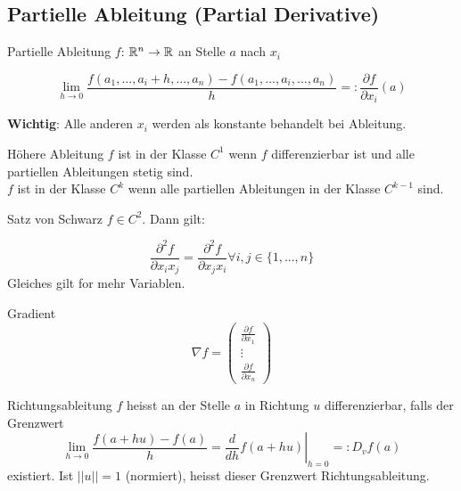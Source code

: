 \subsection{Partielle Ableitung (Partial Derivative)}
\begin{Definition}{Partielle Ableitung}{}
    $f$: $\mathbb{R}^n \rightarrow \mathbb{R}$ an Stelle $a$ nach $x_i$

    \[
        \lim_{h \rightarrow 0} \frac{f(a_1, ..., a_i + h, ..., a_n) - f(a_1, ..., a_i, ..., a_n)}{h} =: \frac{\partial f}{\partial x_i}(a)
    \]

\textbf{Wichtig}: Alle anderen $x_i$ werden als konstante behandelt bei Ableitung.
\end{Definition}

\begin{Definition}{Höhere Ableitung}{}
    $f$ ist in der Klasse $C^1$ wenn $f$ differenzierbar ist und alle partiellen Ableitungen stetig sind.\\
    $f$ ist in der Klasse $C^k$ wenn alle partiellen Ableitungen in der Klasse $C^{k-1}$ sind.
\end{Definition}

\begin{Satz}{Satz von Schwarz}{}
    $f \in C^2$. Dann gilt:

    \[
        \frac{\partial^2 f}{\partial x_i x_j} = \frac{\partial^2 f}{\partial x_j x_i} \forall i, j \in \{1, ..., n\}
    \]
    Gleiches gilt for mehr Variablen.

\end{Satz}


\begin{Definition}{Gradient}{}
    \[
    \nabla f =
        \begin{pmatrix}
            \frac{\partial f}{\partial x_1}\\
            \vdots\\
            \frac{\partial f}{\partial x_n}
        \end{pmatrix}
    \]

\end{Definition}

\begin{Definition}{Richtungsableitung}{}
    $f$ heisst an der Stelle $a$ in Richtung $u$ differenzierbar, falls der Grenzwert 
	\[
		\lim_{h\to0}\frac{f(a + hu) -f(a)}{h} =
		\left.\frac{d}{dh}f(a+hu)\right|_{h = 0}
		=: D_vf(a)
	\]
existiert. Ist $||u|| = 1$ (normiert), heisst dieser Grenzwert Richtungsableitung.
\end{Definition}

